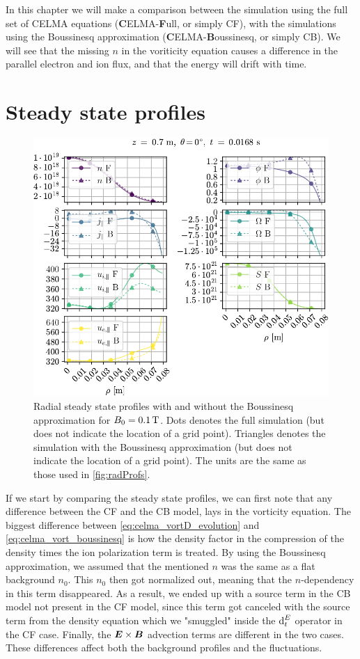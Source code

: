 In this chapter we will make a comparison between the simulation using the full set of CELMA equations (\textbf{C}ELMA-\textbf{F}ull, or simply CF), with the simulations using the Boussinesq approximation (\textbf{C}ELMA-\textbf{B}oussinesq, or simply CB).
We will see that the missing $n$ in the voriticity equation causes a difference in the parallel electron and ion flux, and that the energy will drift with time.

\section{Steady state profiles}
%
\begin{figure}[h]
    \centering
    \includegraphics{fig/results/compareBouss/1DProfRad001B}
    \caption{Radial steady state profiles with and without the Boussinesq approximation for $B_0=0.1\, \text{T}$.
        Dots denotes the full simulation (but does not indicate the location of a grid point).
        Triangles denotes the simulation with the Boussinesq approximation (but does not indicate the location of a grid point).
        The units are the same as those used in \cref{fig:radProfs}.
    }
    \label{fig:compareBoussProfRad}
\end{figure}
%
If we start by comparing the steady state profiles, we can first note that any difference between the CF and the CB model, lays in the vorticity equation.
The biggest difference between \cref{eq:celma_vortD_evolution} and \cref{eq:celma_vort_boussinesq} is how the density factor in the compression of the density times the ion polarization term is treated.
By using the Boussinesq approximation, we assumed that the mentioned $n$ was the same as a flat background $n_0$.
This $n_0$ then got normalized out, meaning that the $n$-dependency in this term disappeared.
As a result, we ended up with a source term in the CB model not present in the CF model, since this term got canceled with the source term from the density equation which we "smuggled" inside the $\text{d}_t^E$ operator in the CF case.
Finally, the $\boldsymbol{E}\times\boldsymbol{B}$ advection terms are different in the two cases.
These differences affect both the background profiles and the fluctuations.

